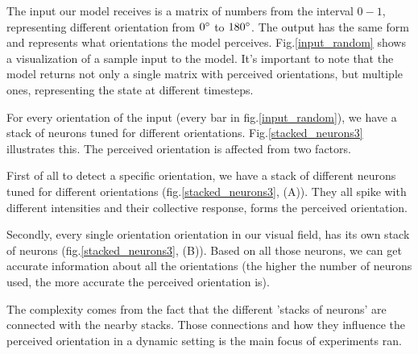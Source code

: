 The input our model receives is a matrix of numbers from the interval $0-1$, representing different orientation from $0\degree$ to $180\degree$. The output has the same form and represents what orientations the model perceives. Fig.\ref{input_random} shows a visualization of a sample input to the model. It's important to note that the model returns not only a single matrix with perceived orientations, but multiple ones, representing the state at different timesteps.



For every orientation of the input (every bar in fig.\ref{input_random}), we have a stack of neurons tuned for different orientations. Fig.\ref{stacked_neurons3} illustrates this. The perceived orientation is affected from two factors. 

First of all to detect a specific orientation, we have a stack of different neurons tuned for different orientations (fig.\ref{stacked_neurons3}, (A)). They all spike with different intensities and their collective response, forms the perceived orientation. 

Secondly, every single orientation orientation in our visual field, has its own stack of neurons (fig.\ref{stacked_neurons3}, (B)). Based on all those neurons, we can get accurate information about all the orientations (the higher the number of neurons used, the more accurate the perceived orientation is).

The complexity comes from the fact that the different 'stacks of neurons' are connected with the nearby stacks. Those connections and how they influence the perceived orientation in a dynamic setting is the main focus of experiments ran.


